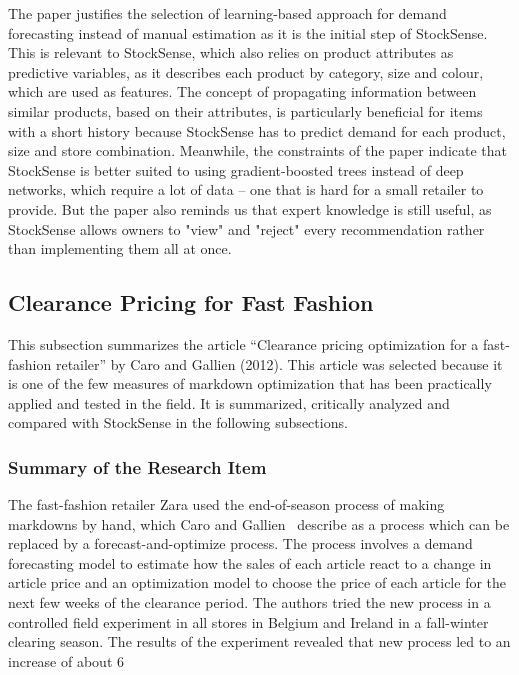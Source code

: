 \documentclass{StockSense}
\begin{document}
The paper justifies the selection of learning-based approach for demand forecasting instead of manual estimation as it is the initial step of StockSense. This is relevant to StockSense, which also relies on product attributes as predictive variables, as it describes each product by category, size and colour, which are used as features. The concept of propagating information between similar products, based on their attributes, is particularly beneficial for items with a short history because StockSense has to predict demand for each product, size and store combination. Meanwhile, the constraints of the paper indicate that StockSense is better suited to using gradient-boosted trees instead of deep networks, which require a lot of data – one that is hard for a small retailer to provide. But the paper also reminds us that expert knowledge is still useful, as StockSense allows owners to "view" and "reject" every recommendation rather than implementing them all at once.

\subsection{Clearance Pricing for Fast Fashion}

This subsection summarizes the article ``Clearance pricing optimization for a fast-fashion retailer'' by Caro and Gallien (2012). This article was selected because it is one of the few measures of markdown optimization that has been practically applied and tested in the field. It is summarized, critically analyzed and compared with StockSense in the following subsections.

\subsubsection{Summary of the Research Item}

The fast-fashion retailer Zara used the end-of-season process of making markdowns by hand, which Caro and Gallien~\cite{caro2012clearance} describe as a process which can be replaced by a forecast-and-optimize process. The process involves a demand forecasting model to estimate how the sales of each article react to a change in article price and an optimization model to choose the price of each article for the next few weeks of the clearance period. The authors tried the new process in a controlled field experiment in all stores in Belgium and Ireland in a fall-winter clearing season. The results of the experiment revealed that new process led to an increase of about 6%
\end{document}
